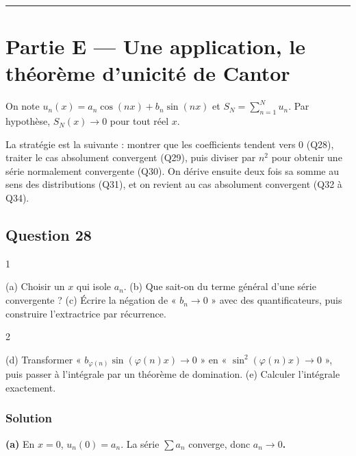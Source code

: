 \documentclass[11pt,a4paper]{article}
\begin{document}
\begin{center}\rule{0.5\linewidth}{0.5pt}\end{center}

\hypertarget{partie-e-une-application-le-thuxe9oruxe8me-dunicituxe9-de-cantor}{%
\section{Partie E --- Une application, le théorème d'unicité de Cantor}\label{partie-e-une-application-le-thuxe9oruxe8me-dunicituxe9-de-cantor}}

On note \(u_n(x)=a_n\cos(nx)+b_n\sin(nx)\) et \(S_N=\sum_{n=1}^Nu_n\). Par hypothèse, \(S_N(x)\to0\) pour tout réel \(x\).

La stratégie est la suivante : montrer que les coefficients tendent vers \(0\) (Q28), traiter le cas absolument convergent (Q29), puis diviser par \(n^2\) pour obtenir une série normalement convergente (Q30). On dérive ensuite deux fois sa somme au sens des distributions (Q31), et on revient au cas absolument convergent (Q32 à Q34).

\hypertarget{question-28}{%
\subsection{Question 28}\label{question-28}}

\begin{indication}{1}

(a) Choisir un \(x\) qui isole \(a_n\). (b) Que sait-on du terme général d'une série convergente ? (c) Écrire la négation de « \(b_n\to0\) » avec des quantificateurs, puis construire l'extractrice par récurrence.

\end{indication}

\begin{indication}{2}

(d) Transformer « \(b_{\varphi(n)}\sin(\varphi(n)x)\to0\) » en « \(\sin^2(\varphi(n)x)\to0\) », puis passer à l'intégrale par un théorème de domination. (e) Calculer l'intégrale exactement.

\end{indication}

\hypertarget{solution-27}{%
\subsubsection{Solution}\label{solution-27}}

\textbf{(a)} En \(x=0\), \(u_n(0)=a_n\). La série \(\sum a_n\) converge, donc \textbf{\(a_n\to0\).}
\end{document}
